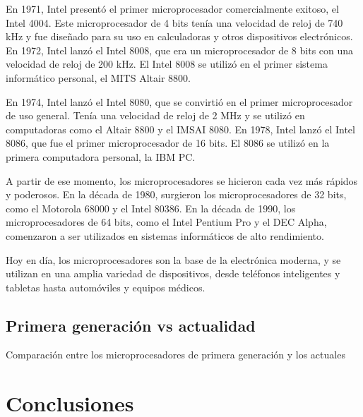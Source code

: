 \documentclass{article}
\begin{document}
En 1971, Intel presentó el primer microprocesador comercialmente exitoso, el Intel 4004. 
Este microprocesador de 4 bits tenía una velocidad de reloj de 740 kHz y fue diseñado para su uso en calculadoras 
y otros dispositivos electrónicos. En 1972, Intel lanzó el Intel 8008, que era un microprocesador de 8 bits 
con una velocidad de reloj de 200 kHz. El Intel 8008 se utilizó en el primer sistema informático personal, 
el MITS Altair 8800.

En 1974, Intel lanzó el Intel 8080, que se convirtió en el primer microprocesador de uso general. 
Tenía una velocidad de reloj de 2 MHz y se utilizó en computadoras como el Altair 8800 y el IMSAI 8080. 
En 1978, Intel lanzó el Intel 8086, que fue el primer microprocesador de 16 bits. El 8086 se utilizó en 
la primera computadora personal, la IBM PC.

A partir de ese momento, los microprocesadores se hicieron cada vez más rápidos y poderosos. En la década de 1980, 
surgieron los microprocesadores de 32 bits, como el Motorola 68000 y el Intel 80386. En la década de 1990, 
los microprocesadores de 64 bits, como el Intel Pentium Pro y el DEC Alpha, comenzaron a ser utilizados 
en sistemas informáticos de alto rendimiento.

Hoy en día, los microprocesadores son la base de la electrónica moderna, y se utilizan en una amplia 
variedad de dispositivos, desde teléfonos inteligentes y tabletas hasta automóviles y equipos médicos.

\subsection*{Primera generación vs actualidad}
Comparación entre los microprocesadores de primera generación y los actuales



\section*{Conclusiones}
\end{document}
